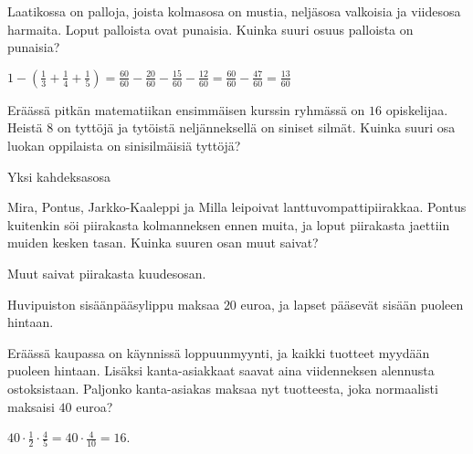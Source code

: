\begin{tehtavasivu}

\begin{tehtava} 
        Laatikossa on palloja, joista kolmasosa on mustia, neljäsosa valkoisia ja viidesosa harmaita. Loput palloista ovat punaisia. Kuinka suuri osuus palloista on punaisia?
        \begin{vastaus}
            $1-(\frac{1}{3}+\frac{1}{4}+\frac{1}{5})
            = \frac{60}{60}-\frac{20}{60}-\frac{15}{60}-\frac{12}{60}
            = \frac{60}{60}-\frac{47}{60}
            = \frac{13}{60}$
        \end{vastaus}
    \end{tehtava}
    
\begin{tehtava} 
Eräässä pitkän matematiikan ensimmäisen kurssin ryhmässä on $16$ opiskelijaa. Heistä $8$ on tyttöjä ja tytöistä neljänneksellä on siniset silmät. Kuinka suuri osa luokan oppilaista on sinisilmäisiä tyttöjä?
        \begin{vastaus}
			Yksi kahdeksasosa
        \end{vastaus}
\end{tehtava}


\begin{tehtava}
        Mira, Pontus, Jarkko-Kaaleppi ja Milla leipoivat lanttuvompattipiirakkaa. Pontus kuitenkin söi piirakasta kolmanneksen ennen muita, ja loput piirakasta jaettiin muiden kesken tasan. Kuinka suuren osan muut saivat?
        \begin{vastaus}
            Muut saivat piirakasta kuudesosan.
        \end{vastaus}
\end{tehtava}
    
\begin{tehtava}
    Huvipuiston sisäänpääsylippu maksaa $20$ euroa, ja lapset pääsevät sisään puoleen hintaan.
    \begin{vastaus}
    \end{vastaus}
\end{tehtava}  

\begin{tehtava}
	Eräässä kaupassa on käynnissä loppuunmyynti, ja kaikki tuotteet myydään puoleen hintaan. Lisäksi kanta-asiakkaat saavat aina viidenneksen alennusta ostoksistaan. Paljonko kanta-asiakas maksaa nyt tuotteesta, joka normaalisti maksaisi $40$ euroa?
    \begin{vastaus}
		$40\cdot \frac{1}{2} \cdot \frac{4}{5}=40\cdot \frac{4}{10}= 16$. 
	\end{vastaus}
\end{tehtava}
    

\end{tehtavasivu}
